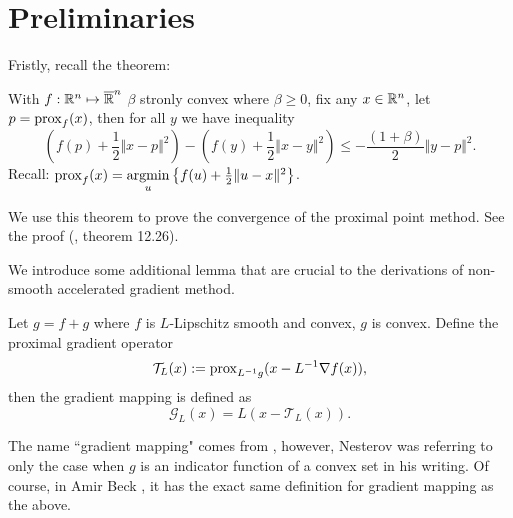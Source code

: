\documentclass[12pt]{article}
\begin{document}
\section{Preliminaries}\label{sec:preliminaries}
    Fristly, recall the theorem: 
    \begin{theorem}\label{thm:ppm_descent_ineq}
        With $f: \mathbb R^n \mapsto \overline {\mathbb R}^n$ $\beta$ stronly convex where $\beta \ge 0$, fix any $x \in \mathbb R^n$, let $p = \operatorname{prox}_f(x)$, then for all $y$ we have inequality 
        $$
            \left(f(p) + \frac{1}{2}\Vert x - p\Vert^2\right)
            - 
            \left(
                f(y) + \frac{1}{2}\Vert x - y\Vert^2 
            \right)
            \le 
            - \frac{(1 + \beta)}{2}\Vert y - p\Vert^2. 
        $$
        Recall: $\operatorname{prox}_f(x) = \mathop{\rm argmin}\limits_{u}\left\lbrace f(u) + \frac{1}{2}\Vert u - x\Vert^2 \right\rbrace$. 
    \end{theorem}
    \begin{remark}
        We use this theorem to prove the convergence of the proximal point method. 
        See the proof (\cite{bauschke_convex_2017}, theorem 12.26). 
    \end{remark}
    We introduce some additional lemma that are crucial to the derivations of non-smooth accelerated gradient method. 
    \begin{definition}
        \label{def:gradient_mapping}
        Let $g = f + g$ where $f$ is $L$-Lipschitz smooth and convex, $g$ is convex. 
        Define the proximal gradient operator
        $$
            \mathcal T_L(x) := \operatorname{prox}_{L^{-1}g}(x - L^{-1}\nabla f(x)),
        $$
        then the gradient mapping is defined as
        $$
            \mathcal G_L(x) = L(x - \mathcal T_L(x)). 
        $$
    \end{definition}
    \begin{remark}
        The name ``gradient mapping" comes from \cite[(2.2.54)]{nesterov_lectures_2018}, however, Nesterov was referring to only the case when $g$ is an indicator function of a convex set in his writing. 
        Of course, in Amir Beck \cite[10.3.2]{beck_first-order_nodate}, it has the exact same definition for gradient mapping as the above. 
    \end{remark}
\end{document}
